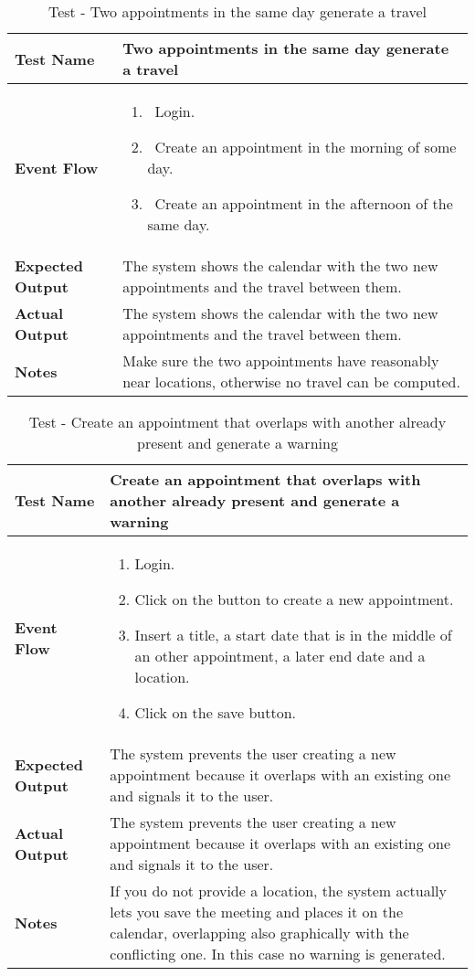 \begin{table}[h]	
\centering
\def\arraystretch{1.5}
\begin{tabular}{|m{7cm}|m{7cm}|}
	\hline
	\textbf{Test Name}            &  Two appointments in the same day generate a travel  \\ \hline
	\textbf{Event Flow}             & 
		\begin{enumerate}
			\item~Login.
			\item~Create an appointment in the morning of some day.
			\item~Create an appointment in the afternoon of the same day.
		\end{enumerate}
	  \\ \hline
	\textbf{Expected Output}  &   The system shows the calendar with the two new appointments and the travel between them.  \\ \hline
	\textbf{Actual Output}       &  The system shows the calendar with the two new appointments and the travel between them.   \\ \hline
	\textbf{Notes} &  Make sure the two appointments have reasonably near locations, otherwise no travel can be computed.  \\ \hline
\end{tabular}
\caption{Test - Two appointments in the same day generate a travel}
\end{table}


\begin{table}[h]	
	\centering
	\def\arraystretch{1.5}
	\begin{tabular}{|m{7cm}|m{7cm}|}
		\hline
		\textbf{Test Name}            & Create an appointment that overlaps with another already present and generate a warning  \\ \hline
		\textbf{Event Flow}             & 
		\begin{enumerate}
			\item Login.
			\item Click on the button to create a new appointment.
			\item Insert a title, a start date that is in the middle of an other appointment, a later end date and a location.
			\item Click on the save button.
		\end{enumerate} \\ \hline
		\textbf{Expected Output}  &  The system prevents the user creating a new appointment because it overlaps with an existing one and signals it to the user.  \\ \hline
		\textbf{Actual Output}       & The system prevents the user creating a new appointment because it overlaps with an existing one and signals it to the user.   \\ \hline
		\textbf{Notes} &  If you do not provide a location, the system actually lets you save the meeting and places it on the calendar, overlapping also graphically with the conflicting one. In this case no warning is generated.  \\ \hline
	\end{tabular}
	\caption{Test -  Create an appointment that overlaps with another already present and generate a warning }
\end{table}


